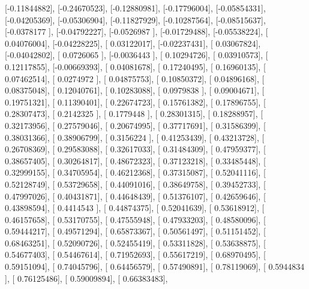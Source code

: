 \documentclass{article}
\begin{document}
       [-0.11844882],
       [-0.24670523],
       [-0.12880981],
       [-0.17796004],
       [-0.05854331],
       [-0.04205369],
       [-0.05306904],
       [-0.11827929],
       [-0.10287564],
       [-0.08515637],
       [-0.0378177 ],
       [-0.04792227],
       [-0.0526987 ],
       [-0.01729488],
       [-0.05538224],
       [ 0.04076004],
       [-0.04228225],
       [ 0.03122017],
       [-0.02237431],
       [ 0.03067824],
       [-0.04042802],
       [ 0.0726065 ],
       [-0.0036443 ],
       [ 0.10294726],
       [ 0.03910573],
       [ 0.12117855],
       [-0.00669393],
       [ 0.04081678],
       [ 0.17240495],
       [ 0.16960135],
       [ 0.07462514],
       [ 0.0274972 ],
       [ 0.04875753],
       [ 0.10850372],
       [ 0.04896168],
       [ 0.08375048],
       [ 0.12040761],
       [ 0.10283088],
       [ 0.0979838 ],
       [ 0.09004671],
       [ 0.19751321],
       [ 0.11390401],
       [ 0.22674723],
       [ 0.15761382],
       [ 0.17896755],
       [ 0.28307473],
       [ 0.2142325 ],
       [ 0.1779448 ],
       [ 0.28301315],
       [ 0.18288957],
       [ 0.32173956],
       [ 0.27579046],
       [ 0.20674995],
       [ 0.37717691],
       [ 0.31586399],
       [ 0.38031366],
       [ 0.38906799],
       [ 0.3156224 ],
       [ 0.41253439],
       [ 0.43213728],
       [ 0.26708369],
       [ 0.29583088],
       [ 0.32617033],
       [ 0.31484309],
       [ 0.47959377],
       [ 0.38657405],
       [ 0.30264817],
       [ 0.48672323],
       [ 0.37123218],
       [ 0.33485448],
       [ 0.32999155],
       [ 0.34705954],
       [ 0.46212368],
       [ 0.37315087],
       [ 0.52041116],
       [ 0.52128749],
       [ 0.53729658],
       [ 0.44091016],
       [ 0.38649758],
       [ 0.39452733],
       [ 0.47997026],
       [ 0.40431871],
       [ 0.44648439],
       [ 0.51376107],
       [ 0.42659646],
       [ 0.43898594],
       [ 0.4414543 ],
       [ 0.44874375],
       [ 0.52041639],
       [ 0.53618912],
       [ 0.46157658],
       [ 0.53170755],
       [ 0.47555948],
       [ 0.47933203],
       [ 0.48580096],
       [ 0.59444217],
       [ 0.49571294],
       [ 0.65873367],
       [ 0.50561497],
       [ 0.51151452],
       [ 0.68463251],
       [ 0.52090726],
       [ 0.52455419],
       [ 0.53311828],
       [ 0.53638875],
       [ 0.54677403],
       [ 0.54467614],
       [ 0.71952693],
       [ 0.55617219],
       [ 0.68970495],
       [ 0.59151094],
       [ 0.74045796],
       [ 0.64456579],
       [ 0.57490891],
       [ 0.78119069],
       [ 0.5944834 ],
       [ 0.76125486],
       [ 0.59009894],
       [ 0.66383483],
\end{document}
